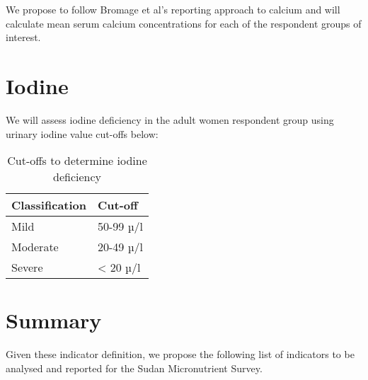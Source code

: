 \documentclass[12pt,a4paper]{article}
\begin{document}
We propose to follow Bromage et al's reporting approach to calcium and will calculate mean serum calcium concentrations for each of the respondent groups of interest.

\hypertarget{iodine}{%
\section{Iodine}\label{iodine}}

We will assess iodine deficiency in the adult women respondent group using urinary iodine value cut-offs \citep{Gorstein:2007wn, Wegmuller:2020bw} below:

\begin{table}[H]

\caption{\label{tab:iodine}Cut-offs to determine iodine deficiency}
\centering
\begin{tabular}[t]{ll}
\toprule
\textbf{Classification} & \textbf{Cut-off}\\
\midrule
\rowcolor{gray!6}  Mild & 50-99 µ/l\\
Moderate & 20-49 µ/l\\
\rowcolor{gray!6}  Severe & < 20 µ/l\\
\bottomrule
\end{tabular}
\end{table}

\hypertarget{summary}{%
\section{Summary}\label{summary}}

Given these indicator definition, we propose the following list of indicators to be analysed and reported for the Sudan Micronutrient Survey.
\end{document}
